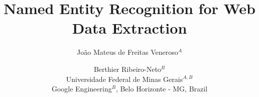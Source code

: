 \documentclass{nle}
\begin{document}
\title{Named Entity Recognition for Web Data Extraction}

\author[João Mateus de Freitas Veneroso and Berthier Ribeiro-Neto]
       {João Mateus de Freitas Veneroso$^A$ \and
        Berthier Ribeiro-Neto$^B$\\
	Universidade Federal de Minas Gerais$^{A,B}$ \\
	Google Engineering$^B$, Belo Horizonte - MG, Brazil}

% 

\maketitle
\end{document}
